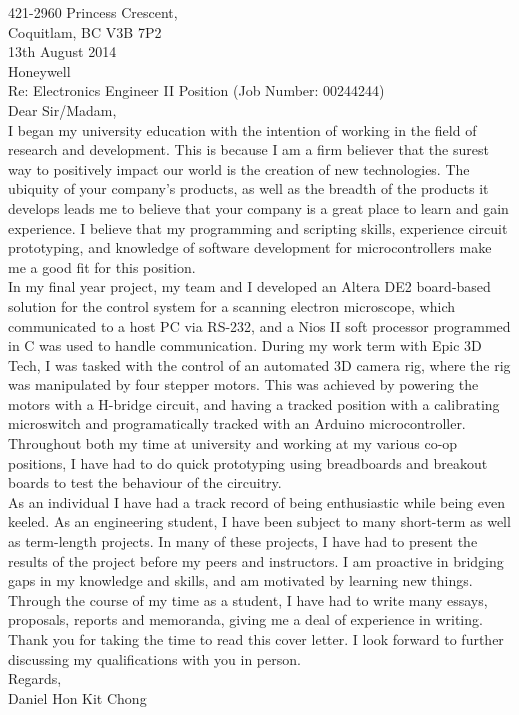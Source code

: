 \documentclass[10pt,a4paper]{article}
\begin{document}
\flushleft
\large
421-2960 Princess Crescent,\\
Coquitlam, BC V3B 7P2 \\
\medskip
13th August 2014 \\
\medskip
Honeywell\\
\medskip
Re: Electronics Engineer II Position (Job Number: 00244244)\\
\medskip
Dear Sir/Madam,\\

\medskip
\hspace{10mm}
I began my university education with the intention of working in the field of research and development. This is because I am a firm believer that the 
surest way to positively impact our world is the creation of new technologies.
The ubiquity of your company's products, as well as the breadth of the products it develops leads me to believe that your company is a great
place to learn and gain experience. 
I believe that my programming and scripting skills, experience circuit prototyping, and knowledge of software development for microcontrollers 
make me a good fit for this position.\\
\medskip
\hspace{10mm}
In my final year project, my team and I developed an Altera DE2 board-based solution for the control system for a scanning electron microscope,
which communicated to a host PC via RS-232, and a Nios II soft processor programmed in C was used to handle communication.
During my work term with Epic 3D Tech, I was tasked with the control of an automated 3D camera rig, where the rig was manipulated by four stepper motors.
This was achieved by powering the motors with a H-bridge circuit, and having a tracked position with a calibrating microswitch and 
programatically tracked with an Arduino microcontroller.
Throughout both my time at university and working at my various co-op positions, I have had to do quick prototyping using breadboards and 
breakout boards to test the behaviour of the circuitry.
\\
\medskip
\hspace{10mm}
As an individual I have had a track record of being enthusiastic while being even keeled. 
As an engineering student, I have been subject to many short-term as well as term-length projects.
In many of these projects, I have had to present the results of the project before my peers and instructors.
I am proactive in bridging gaps in my knowledge and skills, and am motivated by learning new things.
Through the course of my time as a student, I have had to write many essays, proposals, reports and memoranda, giving me a deal of experience in writing.
Thank you for taking the time to read this cover letter.
I look forward to further discussing my qualifications with you in person.\\


\bigskip
Regards, \\
Daniel Hon Kit Chong
\end{document}
